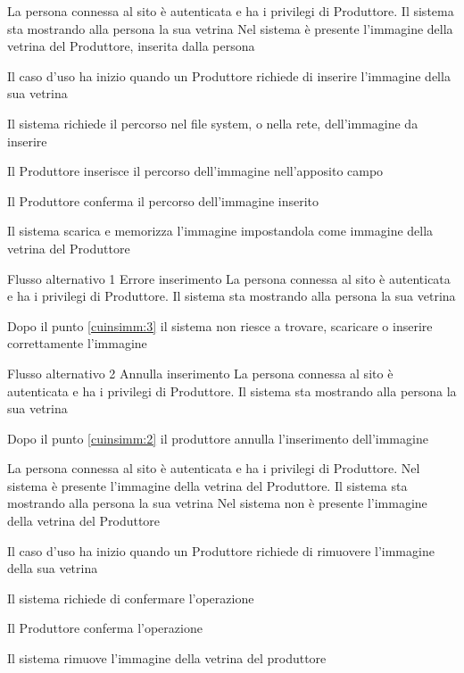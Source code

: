 {}
{La persona connessa al sito è autenticata e ha i privilegi di Produttore. Il sistema sta mostrando alla persona la sua vetrina}
{Nel sistema è presente l'immagine della vetrina del Produttore, inserita dalla persona}
{\begin{enumCU}
		\item Il caso d'uso ha inizio quando un Produttore richiede di inserire l'immagine della sua vetrina
		\item Il sistema richiede il percorso nel file system, o nella rete, dell'immagine da inserire 
		\item Il Produttore inserisce il percorso dell'immagine nell'apposito campo\label{cuinsimm:2}
		\item Il Produttore conferma il percorso dell'immagine inserito\label{cuinsimm:3}
		\item Il sistema scarica e memorizza l'immagine impostandola come immagine della vetrina del Produttore
	\end{enumCU}}
%
{Flusso alternativo 1}%
{Errore inserimento}%
{La persona connessa al sito è autenticata e ha i privilegi di Produttore. Il sistema sta mostrando alla persona la sua vetrina}%
{\postNulle}%
{\begin{enumCU}
		\item Dopo il punto \ref{cuinsimm:3} il sistema non riesce a trovare, scaricare o inserire correttamente l'immagine
	\end{enumCU}}%
%
{Flusso alternativo 2}%
{Annulla inserimento}%
{La persona connessa al sito è autenticata e ha i privilegi di Produttore. Il sistema sta mostrando alla persona la sua vetrina}%
{\postNulle}%
{\begin{enumCU}
		\item Dopo il punto \ref{cuinsimm:2} il produttore annulla l'inserimento dell'immagine
	\end{enumCU}}%


{}
{La persona connessa al sito è autenticata e ha i privilegi di Produttore. Nel sistema è presente l'immagine della vetrina del Produttore. Il sistema sta mostrando alla persona la sua vetrina}
{Nel sistema non è presente l'immagine della vetrina del Produttore}
{\begin{enumCU}
		\item Il caso d'uso ha inizio quando un Produttore richiede di rimuovere l'immagine della sua vetrina
		\item Il sistema richiede di confermare l'operazione \label{cudelimm:2}
		\item Il Produttore conferma l'operazione
		\item Il sistema rimuove l'immagine della vetrina del produttore
	\end{enumCU}}

